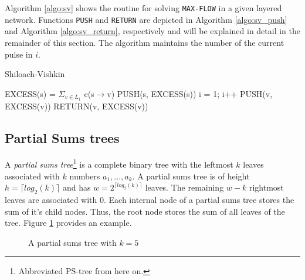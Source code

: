 \documentclass[a4paper,10pt, twocolumn]{article}
\begin{document}
Algorithm \ref{algo:sv} shows the routine for solving \lstinline|MAX-FLOW| in a given layered network. Functions \lstinline|PUSH| and \lstinline|RETURN| are depicted in Algorithm \ref{algo:sv_push} and Algorithm \ref{algo:sv_return}, respectively and will be explained in detail in the remainder of this section. The algorithm maintains the number of the current pulse in $i$.

\begin{algorithm}
\caption{Shiloach-Vishkin}
\label{algo:sv}
\begin{algorithmic}[1]
		\State EXCESS(s) = $\Sigma_{v \in L_1}$ c(s$\rightarrow$v)
		\State PUSH(s, EXCESS(s))
		i = 1;
			\State i++
					\State PUSH(v, EXCESS(v))
				\EndIf
			\EndFor
			\State RETURN(v, EXCESS(v))
		\EndWhile
	\EndFunction
\end{algorithmic}
\end{algorithm}

\subsection{Partial Sums trees}
\label{sec:sv_pstrees}
A \emph{partial sums tree}\footnote{Abbreviated PS-tree from here on.} is a complete binary tree with the leftmost $k$ leaves associated with $k$ numbers $a_1,...,a_k$. A partial sums tree is of height $h = \lceil log_2(k) \rceil$ and has $w = 2^{\lceil log_2(k) \rceil}$ leaves. The remaining $w - k$ rightmost leaves are associated with 0. Each internal node of a partial sums tree stores the sum of it's child nodes. Thus, the root node stores the sum of all leaves of the tree. Figure \ref{fig:pstree} provides an example.

\begin{figure}[H]
\begin{center}
\end{center}
\caption{A partial sums tree with $k=5$}
\label{fig:pstree}
\end{figure}
\end{document}
